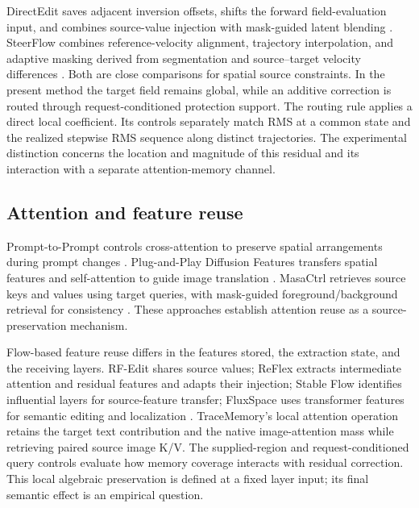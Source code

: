 DirectEdit saves adjacent inversion offsets, shifts the forward field-evaluation input, and combines source-value injection with mask-guided latent blending \cite{yang2026directedit}. SteerFlow combines reference-velocity alignment, trajectory interpolation, and adaptive masking derived from segmentation and source--target velocity differences \cite{dao2026steerflow}. Both are close comparisons for spatial source constraints. In the present method the target field remains global, while an additive correction is routed through request-conditioned protection support. The routing rule applies a direct local coefficient. Its controls separately match RMS at a common state and the realized stepwise RMS sequence along distinct trajectories. The experimental distinction concerns the location and magnitude of this residual and its interaction with a separate attention-memory channel.

\subsection{Attention and feature reuse}
Prompt-to-Prompt controls cross-attention to preserve spatial arrangements during prompt changes \cite{hertz2023prompttoprompt}. Plug-and-Play Diffusion Features transfers spatial features and self-attention to guide image translation \cite{tumanyan2023pnpfeatures}. MasaCtrl retrieves source keys and values using target queries, with mask-guided foreground/background retrieval for consistency \cite{cao2023masactrl}. These approaches establish attention reuse as a source-preservation mechanism.

Flow-based feature reuse differs in the features stored, the extraction state, and the receiving layers. RF-Edit shares source values; ReFlex extracts intermediate attention and residual features and adapts their injection; Stable Flow identifies influential layers for source-feature transfer; FluxSpace uses transformer features for semantic editing and localization \cite{wang2025rfsolver,kim2025reflex,avrahami2025stableflow,dalva2025fluxspace}. TraceMemory's local attention operation retains the target text contribution and the native image-attention mass while retrieving paired source image K/V. The supplied-region and request-conditioned query controls evaluate how memory coverage interacts with residual correction. This local algebraic preservation is defined at a fixed layer input; its final semantic effect is an empirical question.

